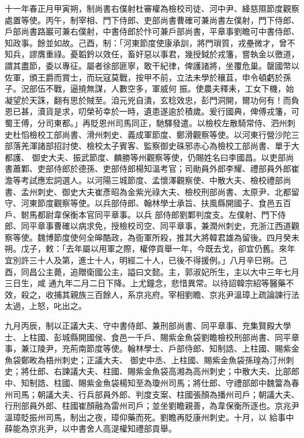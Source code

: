 \begin{pinyinscope}
 十一年春正月甲寅朔，制尚書右僕射杜審權為檢校司徒、河中尹、絳慈隰節度觀察處置等使。丙午，制宰相、門下侍郎、吏部尚書曹確可兼尚書左僕射，門下侍郎、
 戶部尚書路巖可兼右僕射，中書侍郎於忭可兼戶部尚書，平章事劉瞻可中書侍郎、知政事。餘並如故。己酉，制：「河東節度使康承訓，將門瑣質，戎壘微才，曾不知兵，謬膺重祿。憂韜鈐以效任，畜奸惡以事君，幾授鉞於戎籓，嘗執金以徼道，謂其盡節，委以專征。屬者徐部匪寧，敢干紀律，俾護諸將，坐覆危巢。罄國幣以佐軍，頒王爵而賞士，而玩寇莫戰，按甲不前，立法未學於穰苴，申令頓虧於孫子。況部伍不戰，逼撓無謀，人數空多，軍威何
 振。使農夫釋耒，工女下機，始凝望於天誅，翻有思於賊至。洎元兇自潰，玄稔效忠，彭門洞開，爾功何有！而負恩已甚，瀆貨是求，叨榮茍幸於一時，遺患遂逾於積歲。爰行國典，俾傅戎籓，可蜀王傅，分司東都。」再貶恩州司馬同正，馳驛發遣。以檢校左散騎常侍、泗州刺史杜慆檢校工部尚書、滑州刺史、義成軍節度、鄭滑觀察等使。以河東行營沙陀三部落羌渾諸部招討使、檢校太子賓客、監察御史硃邪赤心為檢校工部尚書、單于大都護、
 御史大夫、振武節度、麟勝等州觀察等使，仍賜姓名曰李國昌。以吏部尚書蕭鄴、吏部侍郎於德孫、吏部侍郎楊知溫考官；司勛員外郎李耀、禮部員外郎崔澹等考試應宏詞選人。以河陽三城節度、孟懷澤觀察使、中散大夫、檢校禮部尚書、孟州刺史、御史大夫崔彥昭為金紫光祿大夫、檢校刑部尚書、太原尹、北都留守、河東節度觀察等使。以兵部侍郎、翰林學士承旨、扶風縣開國子、食邑五百戶、駙馬都尉韋保衡本官同平章事。以兵
 部侍郎劉鄴判度支。左僕射、門下侍郎、同平章事曹確以病求免，授檢校司空、同平章事，兼潤州刺史，充浙江西道觀察等使。魏博節度使何全皞酷政，為衙軍所殺，推其大將韓君雄為留後。四月癸未朔。戊子，敕：「去年屬以用軍之際，權停貢舉一年，今既去戈，卻宜仍舊。來年宜別許三十人及第，進士十人，明經二十人，已後不得援例。」八月辛巳朔。己酉，同昌公主薨，追贈衛國公主，謚曰文懿。主，郭淑妃所生，主以大中三年七月三日生，咸
 通九年二月二日下降。上尤鐘念，悲惜異常。以待詔韓宗紹等醫藥不效，殺之，收捕其親族三百餘人，系京兆府。宰相劉瞻、京兆尹溫璋上疏論諫行法太過，上怒，叱出之。



 九月丙辰，制以正議大夫、守中書侍郎、兼刑部尚書、同平章事、充集賢殿大學士、上柱國、彭城縣開國侯、食邑一千戶、賜紫金魚袋劉瞻檢校刑部尚書、同平章事，兼江陵尹，充荊南節度等使。翰林學士、戶部侍郎、知制誥、上柱國、賜紫金魚袋鄭畋為梧州刺史；正議大夫、
 御史中丞、上柱國、賜紫金魚袋孫瑝為汀州刺史；將仕郎、右諫議大夫、柱國、賜紫金魚袋高湘為高州刺史；中散大夫、比部郎中、知制誥、柱國、賜紫金魚袋楊知至為瓊州司馬；將仕郎、守禮部郎中魏簹為春州司馬；朝議大夫、行兵部員外郎、判度支案、柱國張顏為播州司戶；朝議大夫、行刑部員外郎、柱國崔顏融為雷州司戶；並坐劉瞻親善，為韋保衡所逐也。京兆尹溫璋貶振州司馬，制出之夜，璋仰藥而死。劉瞻再貶康州刺史。十月，以
 給事中薛能為京兆尹，以中書舍人高湜權知禮部貢舉。




\end{pinyinscope}
